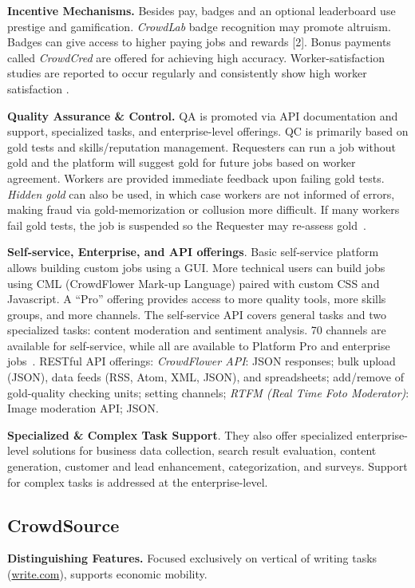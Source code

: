 \documentclass{sigchi}
\begin{document}
{\bf Incentive Mechanisms.} Besides pay, badges and an optional leaderboard use prestige and gamification. {\em CrowdLab} badge recognition may promote altruism. Badges can give access to higher paying jobs and rewards [2]. Bonus payments called {\em CrowdCred} are offered for achieving high accuracy. Worker-satisfaction studies are reported to occur regularly and consistently show high worker satisfaction \cite{eastbayexpress}.

{\bf Quality Assurance \& Control.} QA is promoted via API documentation and support, specialized tasks, and enterprise-level offerings. QC is primarily based on gold tests and skills/reputation management. 
Requesters can run a job without gold and the platform will suggest gold for future jobs based on worker agreement. Workers are provided immediate feedback upon failing gold tests. {\em Hidden gold} can also be used, in which case workers are not informed of errors, making fraud via gold-memorization or collusion more difficult. If many workers fail gold tests, the job is suspended so the Requester may re-assess gold~\cite{finin2010annotating,negri2010creating}.

{\bf Self-service, Enterprise, and API offerings}. Basic self-service platform allows building custom jobs using a GUI. More technical users can build jobs using CML (CrowdFlower Mark-up Language) paired with custom CSS and Javascript. A ``Pro'' offering provides access to more quality tools, more skills groups, and more channels.  
The self-service API 
covers general tasks and two specialized tasks: content moderation 
and sentiment analysis. 
70 channels are available for self-service, while all are available to Platform Pro and enterprise jobs~\cite{cf-josephy13}. RESTful API offerings: {\em CrowdFlower API}: JSON responses; bulk upload (JSON), data feeds (RSS, Atom, XML, JSON), and spreadsheets; add/remove of gold-quality checking units; setting channels; 
{\em RTFM (Real Time Foto Moderator)}: Image moderation API; JSON.

{\bf Specialized \& Complex Task Support}. They also offer specialized enterprise-level solutions for business data collection, search result evaluation, content generation, customer and lead enhancement, categorization, and surveys. Support for complex tasks is addressed at the enterprise-level. 



\subsection{CrowdSource} {\bf Distinguishing Features.} Focused exclusively on vertical of writing tasks (\url{write.com}), supports economic mobility.
\end{document}
